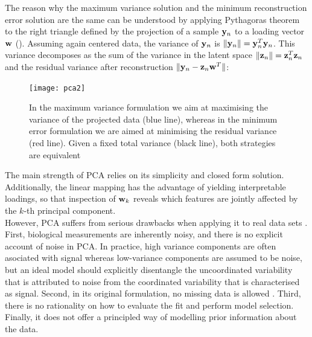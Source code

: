 The reason why the maximum variance solution and the minimum reconstruction error solution are the same can be understood by applying Pythagoras theorem to the right triangle defined by the projection of a sample ${\bf y}_{n}$ to a loading vector ${\bf w}$ ().
Assuming again centered data, the variance of ${\bf y}_{n}$ is $\|{\bf y}_{n}\| = {\bf y}_{n}^T {\bf y}_{n}$. This variance decomposes as the sum of the variance in the latent space $\|{\bf z}_{n}\| = {\bf z}_{n}^T {\bf z}_{n}$ and the residual variance after reconstruction $\|{\bf y}_{n} - {\bf z}_{n} {\bf w}^T \|$:

\begin{figure}[H]
	\centering
	\texttt{[image: pca2]}
	\caption[Maximizing the variance in the principal component space is equivalent to minimizing the data reconstruction error]{In the maximum variance formulation we aim at maximising the variance of the projected data (blue line), whereas in the minimum error formulation we are aimed at minimising the residual variance (red line). Given a fixed total variance (black line), both strategies are equivalent}
	\label{fig:pca2}
\end{figure}

The main strength of PCA relies on its simplicity and closed form solution. Additionally, the linear mapping has the advantage of yielding interpretable loadings, so that inspection of ${\bf w}_k$ reveals which features are jointly affected by the $k$-th principal component.\\
However, PCA suffers from serious drawbacks when applying it to real data sets \cite{Li2017b}. First, biological measurements are inherently noisy, and there is no explicit account of noise in PCA. In practice, high variance components are often asociated with signal whereas low-variance components are assumed to be noise, but an ideal model should explicitly disentangle the uncoordinated variability that is attributed to noise from the coordinated variability that is characterised as signal. Second, in its original formulation, no missing data is allowed \cite{Ilin2010}. Third, there is no rationality on how to evaluate the fit and perform model selection. Finally, it does not offer a principled way of modelling prior information about the data.

